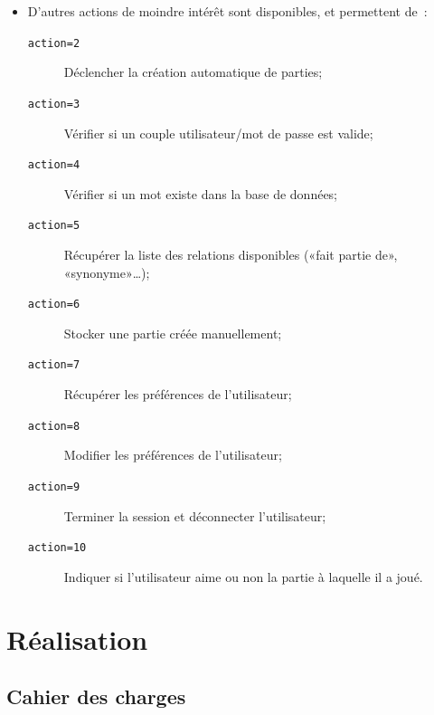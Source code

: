 \documentclass[a4paper,11pt,french]{article}
\begin{document}
{\begin{itemize}
\verb!server.php?action=1&gid=!\textit{\texttt{numéro de partie}}\verb!&pgid=!\textit{\texttt{numéro de partie}}

Cette requête doit aussi prendre un couple \textit{\texttt{numéro du mot du nuage}}\verb!=!\textit{\texttt{numéro de la relation}} pour
chaque réponse. Elle renvoie la structure suivante~:
{
\small
\begin{alltt}
\{
\quad"scoreTotal":\textit{Score pour la partie},
\quad"alreadyPlayed":\textit{true si la partie a déjà été jouée, false sinon},
\quad"author":\textit{Créateur de la partie}",
\quad"minScore":\textit{Plus petit score pour un mot},
\quad"maxScore":\textit{Plus grand score pour un mot},
\quad"newGame":\textit{Nouvelle partie, même format que action=0},
\quad"scores":[
\quad\quad\{"name":"\textit{Mot nuage}", "score":\textit{Score pour le mot}\}
\quad]
\}
\end{alltt}
}

\item D'autres actions de moindre intérêt sont disponibles, et permettent de~:
\begin{description}
\item[\verb!action=2!] Déclencher la création automatique de parties;
\item[\verb!action=3!] Vérifier si un couple utilisateur/mot de passe est valide;
\item[\verb!action=4!] Vérifier si un mot existe dans la base de données;
\item[\verb!action=5!] Récupérer la liste des relations disponibles («fait partie de», «synonyme»…);
\item[\verb!action=6!] Stocker une partie créée manuellement;
\item[\verb!action=7!] Récupérer les préférences de l'utilisateur;
\item[\verb!action=8!] Modifier les préférences de l'utilisateur;
\item[\verb!action=9!] Terminer la session et déconnecter l'utilisateur;
\item[\verb!action=10!] Indiquer si l'utilisateur aime ou non la partie à laquelle il a joué.
\end{description}

\end{itemize}

\section{Réalisation}
\subsection{Cahier des charges}

}
\end{document}
